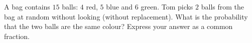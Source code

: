 A bag contains $15$ balls: $4$ red, $5$ blue and $6$ green. Tom picks $2$ balls from the bag at random without looking (without replacement). What is the probability that the two balls are the same colour? Express your answer as a common fraction.
